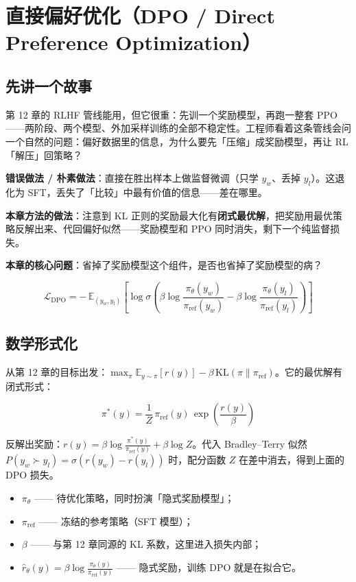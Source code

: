 \documentclass{article}
\begin{document}
\section*{直接偏好优化（DPO / Direct Preference Optimization）}

\subsection*{先讲一个故事}

第 12 章的 RLHF 管线能用，但它很重：先训一个奖励模型，再跑一整套 PPO——两阶段、两个模型、外加采样训练的全部不稳定性。工程师看着这条管线会问一个自然的问题：偏好数据里的信息，为什么要先「压缩」成奖励模型，再让 RL「解压」回策略？

\textbf{错误做法 / 朴素做法}：直接在胜出样本上做监督微调（只学 $y_w$、丢掉 $y_l$）。这退化为 SFT，丢失了「比较」中最有价值的信息——差在哪里。

\textbf{本章方法的做法}：注意到 KL 正则的奖励最大化有\textbf{闭式最优解}，把奖励用最优策略反解出来、代回偏好似然——奖励模型和 PPO 同时消失，剩下一个纯监督损失。

\textbf{本章的核心问题}：省掉了奖励模型这个组件，是否也省掉了奖励模型的病？

\[
\boxed{\mathcal{L}_{\mathrm{DPO}} = -\,\mathbb{E}_{(y_w, y_l)}\left[\log \sigma\!\left(\beta\log\frac{\pi_{\theta}(y_w)}{\pi_{\mathrm{ref}}(y_w)} - \beta\log\frac{\pi_{\theta}(y_l)}{\pi_{\mathrm{ref}}(y_l)}\right)\right]}
\]

\subsection*{数学形式化}

从第 12 章的目标出发：$\max_{\pi} \mathbb{E}_{y\sim\pi}[r(y)] - \beta\,\mathrm{KL}(\pi \| \pi_{\mathrm{ref}})$。它的最优解有闭式形式：

\[
\boxed{\pi^{*}(y) = \frac{1}{Z}\,\pi_{\mathrm{ref}}(y)\,\exp\!\left(\frac{r(y)}{\beta}\right)}
\]

反解出奖励：$r(y) = \beta\log\frac{\pi^{*}(y)}{\pi_{\mathrm{ref}}(y)} + \beta\log Z$。代入 Bradley--Terry 似然 $P(y_w \succ y_l)=\sigma(r(y_w)-r(y_l))$ 时，配分函数 $Z$ 在差中消去，得到上面的 DPO 损失。

\begin{itemize}
  \item $\pi_{\theta}$ —— 待优化策略，同时扮演「隐式奖励模型」；
  \item $\pi_{\mathrm{ref}}$ —— 冻结的参考策略（SFT 模型）；
  \item $\beta$ —— 与第 12 章同源的 KL 系数，这里进入损失内部；
  \item $\hat{r}_{\theta}(y) = \beta\log\frac{\pi_{\theta}(y)}{\pi_{\mathrm{ref}}(y)}$ —— 隐式奖励，训练 DPO 就是在拟合它。
\end{itemize}
\end{document}
